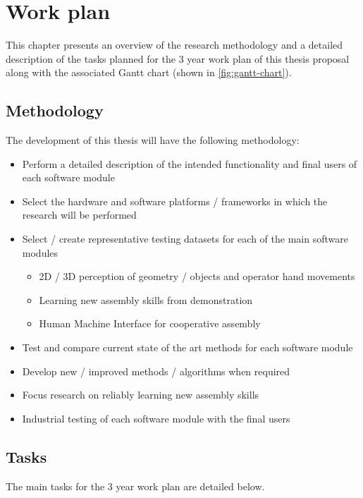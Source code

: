 \chapter{Work plan}\label{chap:work-plan}

This chapter presents an overview of the research methodology and a detailed description of the tasks planned for the 3 year work plan of this thesis proposal along with the associated Gantt chart (shown in \cref{fig:gantt-chart}).


\section{Methodology}

The development of this thesis will have the following methodology:

\begin{itemize}
	\item Perform a detailed description of the intended functionality and final users of each software module
	\item Select the hardware and software platforms / frameworks in which the research will be performed
	\item Select / create representative testing datasets for each of the main software modules
	\begin{itemize}
		\item 2D / 3D perception of geometry / objects and operator hand movements
		\item Learning new assembly skills from demonstration
		\item Human Machine Interface for cooperative assembly
	\end{itemize}
	\item Test and compare current state of the art methods for each software module
	\item Develop new / improved methods / algorithms when required
	\item Focus research on reliably learning new assembly skills
	\item Industrial testing of each software module with the final users
\end{itemize}



\section{Tasks}

The main tasks for the 3 year work plan are detailed below.


